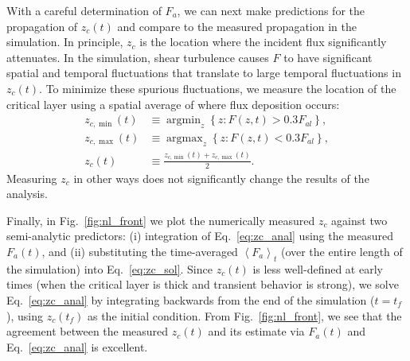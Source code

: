\documentclass[
        fleqn,
        usenatbib,
        referee,
    ]{mnras}
\newcommand*{\ev}[1]{\left\langle#1\right\rangle}
\newcommand*{\z}[1]{\left\{#1\right\}}
\DeclareMathOperator*{\argmin}{argmin}
\DeclareMathOperator*{\argmax}{argmax}
\begin{document}
With a careful determination of $F_a$, we can next make predictions for the
propagation of $z_c(t)$ and compare to the measured propagation in the
simulation.
In principle, $z_c$ is the location where the incident flux significantly
attenuates. In the simulation, shear turbulence causes $F$ to have significant
spatial and temporal fluctuations that translate to large temporal fluctuations
in $z_c(t)$. To minimize these spurious fluctuations, we measure the location of
the critical layer using a spatial average of where flux deposition occurs:
\begin{align}
    z_{c, \min}(t) &\equiv \argmin_z \z{z: F(z, t) > 0.3F_{al}},\\
    z_{c, \max}(t) &\equiv \argmax_z \z{z: F(z, t) < 0.3F_{al}},\\
    z_c(t) &\equiv \frac{z_{c, \min}(t) + z_{c, \max}(t)}{2}.\label{eq:zc_def}
\end{align}
Measuring $z_c$ in other ways does not significantly change the results of the
analysis.

Finally, in Fig.~\ref{fig:nl_front} we plot the numerically measured $z_c$
against two semi-analytic predictors: (i) integration of Eq.~\eqref{eq:zc_anal}
using the measured $F_a(t)$, and (ii) substituting the time-averaged
$\ev{F_a}_t$ (over the entire length of the simulation) into
Eq.~\eqref{eq:zc_sol}. Since $z_c(t)$ is less well-defined at early times (when
the critical layer is thick and transient behavior is strong), we solve
Eq.~\eqref{eq:zc_anal} by integrating backwards from the end of the simulation
($t = t_f$), using $z_c(t_f)$ as the initial condition. From
Fig.~\ref{fig:nl_front}, we see that the agreement between the measured $z_c(t)$
and its estimate via $F_a(t)$ and Eq.~\eqref{eq:zc_anal} is excellent.
\end{document}
